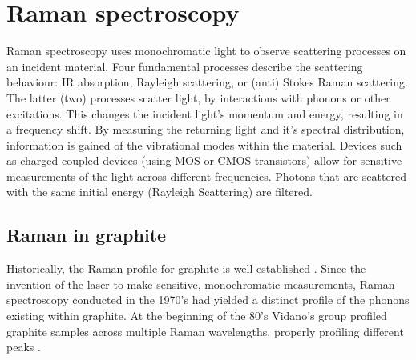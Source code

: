 \documentclass[../Matt_Gebert_Honours_Thesis.tex]{subfiles}
\begin{document}

\section{Raman spectroscopy}

Raman spectroscopy uses monochromatic light to observe scattering processes on an incident material. Four fundamental processes describe the scattering behaviour: IR absorption, Rayleigh scattering, or (anti) Stokes Raman scattering. The latter (two) processes scatter light, by interactions with phonons or other excitations. This changes the incident light's momentum and energy, resulting in a frequency shift. By measuring the returning light and it's spectral distribution, information is gained of the vibrational modes within the material. Devices such as charged coupled devices (using MOS or CMOS transistors) allow for sensitive measurements of the light across different frequencies. Photons that are scattered with the same initial energy (Rayleigh Scattering) are filtered.

\subsection{Raman in graphite}
Historically, the Raman profile for graphite is well established \cite{vidano_observation_1981}. Since the invention of the laser to make sensitive, monochromatic measurements, Raman spectroscopy conducted in the 1970's had yielded a distinct profile of the phonons existing within  graphite\cite{nemanich_first-_1979,tuinstra_characterization_1970,tuinstra_raman_1970}. At the beginning of the 80's Vidano's group profiled graphite samples across multiple Raman wavelengths, properly profiling different peaks \cite{vidano_observation_1981}. 
\end{document}
